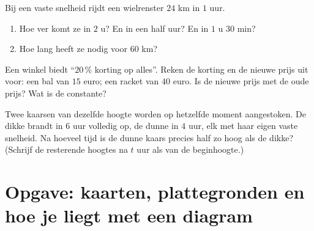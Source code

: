 \begin{exercise}[$\star\star$]\label{exo:g6:propdata:10}
Bij een vaste snelheid rijdt een wielrenster $24$ km in $1$ uur.
\begin{enumerate}
  \item Hoe ver komt ze in $2$ u? En in een half uur? En in $1$ u $30$ min?
  \item Hoe lang heeft ze nodig voor $60$ km?
\end{enumerate}
\end{exercise}

\begin{exercise}[$\star\star$]\label{exo:g6:propdata:11}
Een winkel biedt ``$20\,\%$ korting op alles''. Reken de korting en de nieuwe
prijs uit voor: een bal van $15$ euro; een racket van $40$ euro. Is de nieuwe
prijs  met de oude prijs? Wat is de constante?
\end{exercise}

\begin{exercise}[$\star\star\star$]\label{exo:g6:propdata:12}
Twee kaarsen van dezelfde hoogte worden op hetzelfde moment aangestoken. De
dikke brandt in $6$ uur volledig op, de dunne in $4$ uur, elk met haar eigen
vaste snelheid. Na hoeveel tijd is de dunne kaars precies half zo hoog als de
dikke? (Schrijf de resterende hoogtes na $t$ uur als  van de
beginhoogte.)
\end{exercise}

\section{Opgave: kaarten, plattegronden en hoe je liegt met een diagram}

